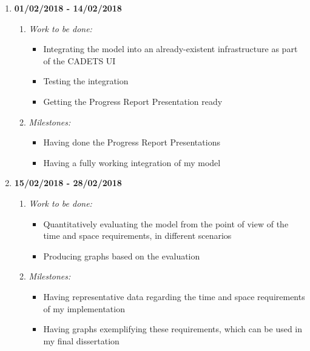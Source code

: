 \begin{enumerate}
	\vspace{5mm}
	
	\item \textbf{01/02/2018 - 14/02/2018}
		\begin{enumerate}
			\item \emph{Work to be done:}
			\begin{itemize}
				\item Integrating the model into an already-existent infrastructure as part of the CADETS UI 
				\item Testing the integration
				\item Getting the Progress Report Presentation ready
			\end{itemize}
			\item \emph{Milestones:}
			\begin{itemize}
				\item Having done the Progress Report Presentations
				\item Having a fully working integration of my model
			\end{itemize}
		\end{enumerate}
	
	\vspace{5mm}
	
	\item \textbf{15/02/2018 - 28/02/2018}
		\begin{enumerate}
			\item \emph{Work to be done:}
			\begin{itemize}
				\item Quantitatively evaluating the model from the point of view of the time and space requirements, in different scenarios
				\item Producing graphs based on the evaluation
			\end{itemize}
			\item \emph{Milestones:}
			\begin{itemize}
				\item Having representative data regarding the time and space requirements of my implementation
				\item Having graphs exemplifying these requirements, which can be used in my final dissertation
			\end{itemize}
		\end{enumerate}
	
	\vspace{5mm}
	

\end{enumerate}
